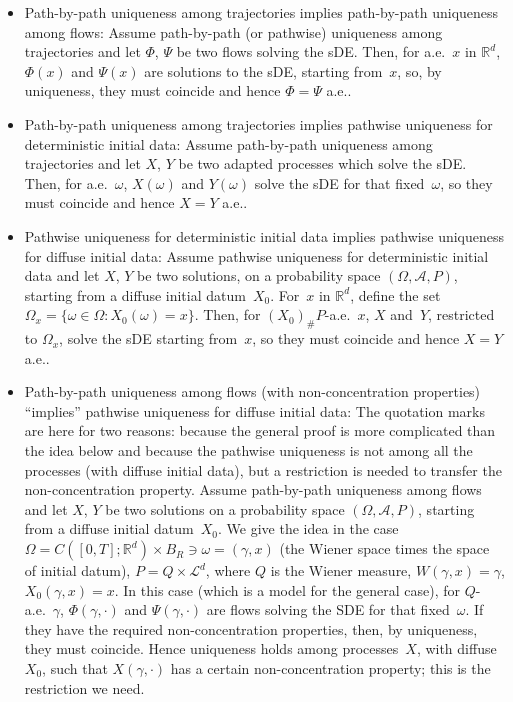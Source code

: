 \documentclass[a4paper,10pt]{article}
\newcommand\1{\mathbbm{1}}
\newcommand{\mr}{\mathbb{R}}
\newcommand{\mc}{\mathcal}
\numberwithin{equation}{section}
\begin{document}
\begin{itemize}
\item Path-by-path uniqueness among trajectories implies path-by-path uniqueness among flows: Assume path-by-path (or pathwise) uniqueness among trajectories and let $\Phi$, $\Psi$ be two flows solving the sDE. Then, for a.e.~$x$ in $\mr^d$, $\Phi(x)$ and $\Psi(x)$ are solutions to the sDE, starting from~$x$, so, by uniqueness, they must coincide and hence $\Phi=\Psi$ a.e..
\item Path-by-path uniqueness among trajectories implies pathwise uniqueness for deterministic initial data: Assume path-by-path uniqueness among trajectories and let $X$, $Y$ be two adapted processes which solve the sDE. Then, for a.e.~$\omega$, $X(\omega)$ and $Y(\omega)$ solve the sDE for that fixed~$\omega$, so they must coincide and hence $X=Y$ a.e..
\item Pathwise uniqueness for deterministic initial data implies pathwise uniqueness for diffuse initial data: Assume pathwise uniqueness for deterministic initial data and let $X$, $Y$ be two solutions, on a probability space $(\Omega,\mc{A},P)$, starting from a diffuse initial datum~$X_0$. For~$x$ in $\mr^d$, define the set $\Omega_x=\{\omega\in\Omega \colon X_0(\omega)=x\}$. Then, for $(X_0)_\#P$-a.e.~$x$, $X$ and~$Y$, restricted to $\Omega_x$, solve the sDE starting from~$x$, so they must coincide and hence $X=Y$ a.e..
\item Path-by-path uniqueness among flows (with non-concentration properties) ``implies'' pathwise uniqueness for diffuse initial data: The quotation marks are here for two reasons: because the general proof is more complicated than the idea below and because the pathwise uniqueness is not among all the processes (with diffuse initial data), but a restriction is needed to transfer the non-concentration property. Assume path-by-path uniqueness among flows and let $X$, $Y$ be two solutions on a probability space $(\Omega,\mc{A},P)$, starting from a diffuse initial datum~$X_0$. We give the idea in the case $\Omega=C([0,T];\mr^d)\times B_R\ni\omega=(\gamma,x)$ (the Wiener space times the space of initial datum), $P=Q\times\mc{L}^d$, where $Q$ is the Wiener measure, $W(\gamma,x)=\gamma$, $X_0(\gamma,x)=x$. In this case (which is a model for the general case), for $Q$-a.e.~$\gamma$, $\Phi(\gamma,\cdot)$ and $\Psi(\gamma,\cdot)$ are flows solving the SDE for that fixed~$\omega$. If they have the required non-concentration properties, then, by uniqueness, they must coincide. Hence uniqueness holds among processes~$X$, with diffuse~$X_0$, such that $X(\gamma,\cdot)$ has a certain non-concentration property; this is the restriction we need.
\end{itemize}
\end{document}
